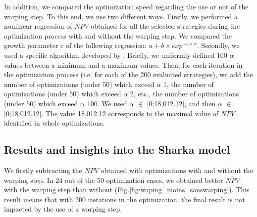 In addition, we compared the optimization speed regarding the use or not of the warping step. To this end, we use two different ways. Firstly, we performed a nonlinear regression of $\overline{NPV}$ obtained for all the selected strategies during the optimization process with and without the warping step. We compared the growth parameter c of the following regression:
$a+b \times exp^{-c\times x}$.
Secondly, we used a specific algorithm developed by . Briefly, we uniformly defined 100 $\alpha$ values between a minimum and a maximum values. Then, for each iteration in the optimization process (i.e. for each of the 200 evaluated strategies), we add the number of optimizations (under 50) which exceed $\alpha$ 1, the number of optimizations (under 50) which exceed $\alpha$ 2, etc., the number of optimizations (under 50) which exceed $\alpha$ 100. We used $\alpha$ $\in$ [0;18,012.12], and then $\alpha$ $\in$ [0;18,012.12]. The value 18,012.12 corresponds to the maximal value of $\overline{NPV}$ identified in whole optimizations.


\subsection{Results and insights into the Sharka model}

We firstly subtracting the $\overline{NPV}$ obtained with optimizations with and without the warping step. In 24 out of the 50 optimization cases, we obtained better $\overline{NPV}$ with the warping step than without (Fig.\ref{fig:waping_moins_sanswarping}). This result means that with 200 iterations in the optimization, the final result is not impacted by the use of a warping step.

